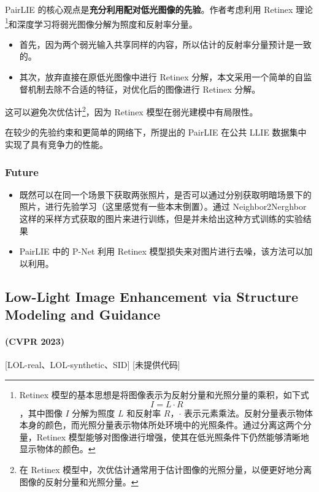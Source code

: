 \documentclass[letterpaper,10pt]{article}
\begin{document}
			PairLIE 的核心观点是\textbf{充分利用配对低光图像的先验}。作者考虑利用 Retinex 理论\footnote{Retinex 模型的基本思想是将图像表示为反射分量和光照分量的乘积，如下式$$I = L \cdot R$$，其中图像 $I$ 分解为照度 $L$ 和反射率 $R$，$\cdot$ 表示元素乘法。反射分量表示物体本身的颜色，而光照分量表示物体所处环境中的光照条件。通过分离这两个分量，Retinex 模型能够对图像进行增强，使其在低光照条件下仍然能够清晰地显示物体的颜色。}和深度学习将弱光图像分解为照度和反射率分量。
			
			\begin{itemize}
				\item [(1)]
				首先，因为两个弱光输入共享同样的内容，所以估计的反射率分量预计是一致的。
				\item [(2)]
				其次，放弃直接在原低光图像中进行 Retinex 分解，本文采用一个简单的自监督机制去除不合适的特征，对优化后的图像进行 Retinex 分解。
			\end{itemize}
					
			这可以避免次优估计\footnote{在 Retinex 模型中，次优估计通常用于估计图像的光照分量，以便更好地分离图像的反射分量和光照分量。}，因为 Retinex 模型在弱光建模中有局限性。
			
			在较少的先验约束和更简单的网络下，所提出的 PairLIE 在公共 LLIE 数据集中实现了具有竞争力的性能。
		
			\subsubsection{Future}
			
			\begin{itemize}
				\item [(1)]
				既然可以在同一个场景下获取两张照片，是否可以通过分别获取明暗场景下的照片，进行先验学习（这里感觉有一些本末倒置）。通过 Neighbor2Nerghbor 这样的采样方式获取的图片来进行训练，但是并未给出这种方式训练的实验结果
				\item [(2)]
				PairLIE 中的 P-Net 利用 Retinex 模型损失来对图片进行去噪，该方法可以加以利用。
			\end{itemize}
		
		\subsection{Low-Light Image Enhancement via Structure Modeling and Guidance}
		\paragraph{(CVPR 2023)} [LOL-real、LOL-synthetic、SID] [未提供代码]
		
\end{document}
